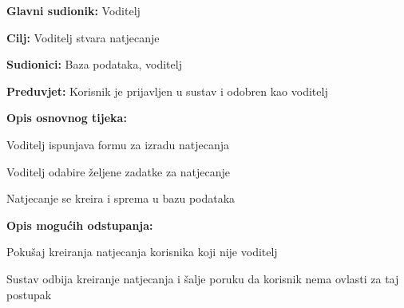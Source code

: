 					
					\noindent {}
					\begin{packed_item}
						
						\item \textbf{Glavni sudionik: }Voditelj
						\item  \textbf{Cilj:} Voditelj stvara natjecanje  
						\item  \textbf{Sudionici:} Baza podataka, voditelj
						\item  \textbf{Preduvjet:} Korisnik je prijavljen u sustav i odobren kao voditelj
						\item  \textbf{Opis osnovnog tijeka:}
						
						\item[] \begin{packed_enum}
							
							\item Voditelj ispunjava formu za izradu natjecanja
							\item Voditelj odabire željene zadatke za natjecanje
							\item Natjecanje se kreira i sprema u bazu podataka
							
						\end{packed_enum}
						
						\item  \textbf{Opis mogućih odstupanja:}
						
						\item[] \begin{packed_item}
							
							\item[2.a] Pokušaj kreiranja natjecanja korisnika koji nije voditelj
							\item[] \begin{packed_enum}
								
								\item Sustav odbija kreiranje natjecanja i šalje poruku da korisnik nema ovlasti za taj postupak 
								
							\end{packed_enum}
						\end{packed_item}
					\end{packed_item}
					
